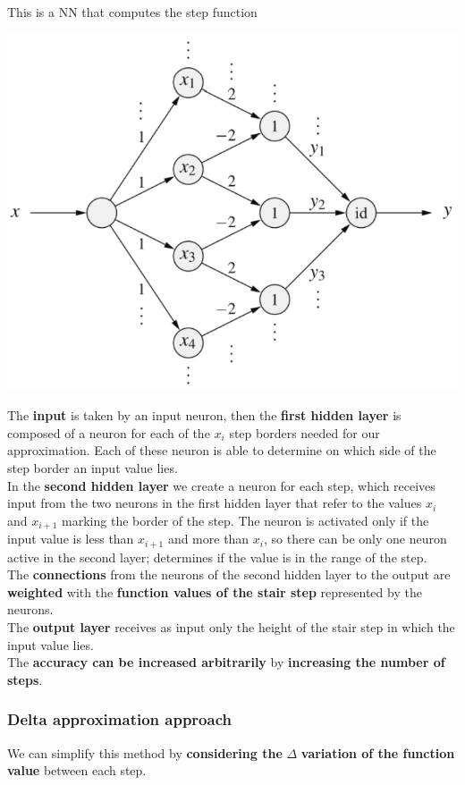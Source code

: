 \newpage

This is a NN that computes the step function
\begin{center}
	\includegraphics[width=0.7\columnwidth]{img/NN/NN2}
\end{center}

The \textbf{input} is taken by an input neuron, then the \textbf{first hidden layer} is composed of a neuron for each of the $x_i$ step borders needed for our approximation. Each of these neuron is able to determine on which side of the step border an input value lies.\\

In the \textbf{second hidden layer} we create a neuron for each step, which receives input from the two neurons in the first hidden layer that refer to the values $x_i$ and $x_{i+1}$ marking the border of the step. The neuron is activated only if the input value is less than $x_{i+1}$ and more than $x_i$, so there can be only one neuron active in the second layer; determines if the value is in the range of the step.\\

The \textbf{connections} from the neurons of the second hidden layer to the output are \textbf{weighted} with the \textbf{function values of the stair step} represented by the neurons.\\

The \textbf{output layer} receives as input only the height of the stair step in which the input value lies.\\

The \textbf{accuracy can be increased arbitrarily} by \textbf{increasing the number of steps}.

\newpage

\subsubsection{Delta approximation approach}
We can simplify this method by \textbf{considering the} $\Delta$ \textbf{variation of the function value} between each step.\\

